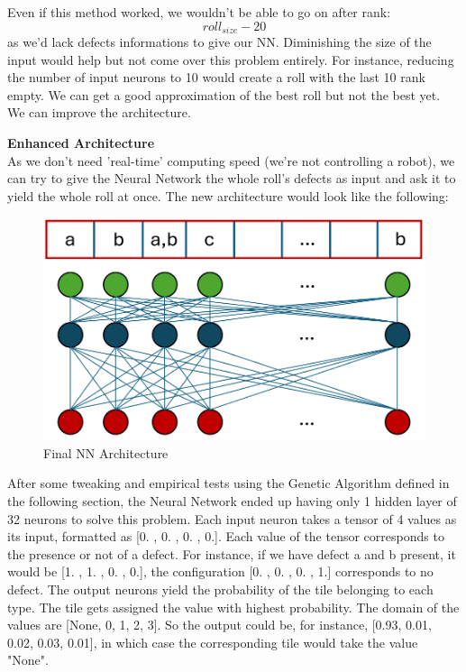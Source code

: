 \documentclass{modeleRapport}
\begin{document}
Even if this method worked, we wouldn't be able to go on after rank: \[roll_{size} - 20 \] as we'd lack defects informations 
to give our NN. Diminishing the size of the input would help but not come over this problem entirely. For instance,
reducing the number of input neurons to 10 would create a roll with the last 10 rank empty. We can get a good approximation
of the best roll but not the best yet. We can improve the architecture.

\textbf{Enhanced Architecture}\\

As we don't need 'real-time' computing speed (we're not controlling a robot), we can try to give the Neural Network the whole
roll's defects as input and ask it to yield the whole roll at once. The new architecture would look like the following:\\

\begin{figure}[H]
    \centering
    \includegraphics[width=12cm]{Images/NN_V2.png}
    \caption{Final NN Architecture}
\end{figure}

After some tweaking and empirical tests using the Genetic Algorithm defined in the following section, the Neural Network
ended up having only 1 hidden layer of 32 neurons to solve this problem. Each input neuron takes a tensor of 4 values as 
its input, formatted as [0. , 0. , 0. , 0.]. Each value of the tensor corresponds to the presence or not of a defect. For
instance, if we have defect a and b present, it would be [1. , 1. , 0. , 0.], the configuration [0. , 0. , 0. , 1.]
corresponds to no defect. The output neurons yield the probability of the tile belonging to each type. The tile gets 
assigned the value with highest probability. The domain of the values are [None, 0, 1, 2, 3]. So the output could be, for
instance, [0.93, 0.01, 0.02, 0.03, 0.01], in which case the corresponding tile would take the value "None".
\end{document}
